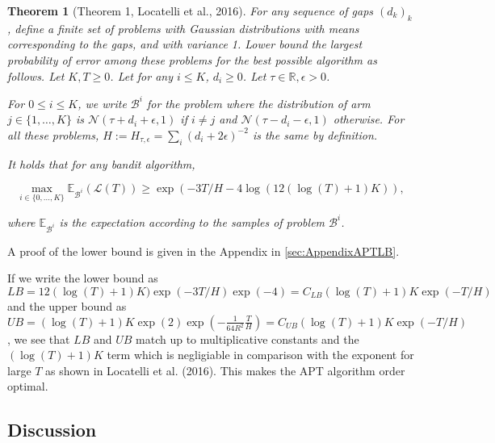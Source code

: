 \documentclass[11pt,]{article}
\newtheorem{theorem}{Theorem}
\begin{document}
\begin{theorem}[Theorem 1, Locatelli et al., 2016] 
\label{theorem:Locatelli2016Theorem1}
For any sequence of gaps $(d_k)_k$, define a finite set of problems with Gaussian distributions with means corresponding to the gaps, and with variance 1. Lower bound the largest probability of error among these problems for the best possible algorithm as follows. Let $K,T \geq 0$. Let for any $i \leq K$, $d_i \geq 0$. Let $\tau \in \mathbb{R}, \epsilon > 0$.

For $0 \leq i \leq K$, we write $\mathcal{B}^i$ for the problem where the distribution of arm $j \in \{1, \dots, K\}$ is $\mathcal{N}(\tau+d_i+\epsilon, 1)$ if $i \neq j$ and $\mathcal{N}(\tau-d_i-\epsilon, 1)$ otherwise. For all these problems, $H := H_{\tau, \epsilon} = \sum_i (d_i+2\epsilon)^{-2}$ is the same by definition.

It holds that for any bandit algorithm,

\begin{equation*}
\max_{i \in \{0, \dots, K\}} \mathbb{E}_{\mathcal{B}^i} (\mathcal{L}(T)) \geq \exp(-3T/H-4 \log(12(\log(T)+1)K)),
\end{equation*}

where $\mathbb{E}_{\mathcal{B}^i}$ is the expectation according to the samples of problem $\mathcal{B}^i$.
\end{theorem}

A proof of the lower bound is given in the Appendix in
\autoref{sec:AppendixAPTLB}.

If we write the lower bound as
\(LB = 12(\log(T)+1)K)\exp(-3T/H)\exp(-4) = C_{LB}(\log(T)+1)K\exp(-T/H)\)
and the upper bound as
\(UB = (\log(T)+1)K \exp(2) \exp(-\frac{1}{64R^2}\frac{T}{H}) = C_{UB}(\log(T)+1)K\exp(-T/H)\),
we see that \(LB\) and \(UB\) match up to multiplicative constants and
the \((\log(T)+1)K\) term which is negligiable in comparison with the
exponent for large \(T\) as shown in Locatelli et al. (2016). This makes
the APT algorithm order optimal.

\subsection{\texorpdfstring{Discussion
\label{sec:DiscussionLocatelli}}{Discussion }}\label{discussion}
\end{document}
